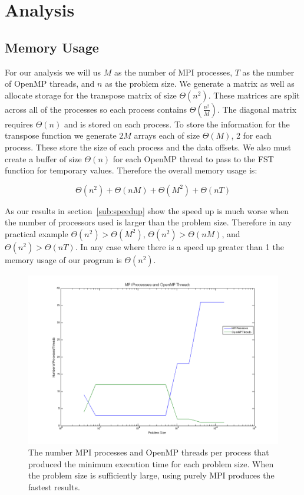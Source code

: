 \documentclass{article}
\begin{document}
	

\section{Analysis}

\subsection{Memory Usage}

	For our analysis we will us $M$ as the number of MPI processes, $T$ as the number of OpenMP threads, and $n$ as the problem size. We generate a matrix as well as allocate storage for the transpose matrix of size $\Theta(n^2)$. These matrices are split across all of the processes so each process contains $\Theta(\frac{n^2}{M})$. The diagonal matrix requires $\Theta(n)$ and is stored on each process. To store the information for the transpose function we generate $2M$ arrays each of size $\Theta(M)$, 2 for each process. These store the size of each process and the data offsets. We also must create a buffer of size $\Theta(n)$ for each OpenMP thread to pass to the FST function for temporary values. Therefore the overall memory usage is:

	\begin{equation}
		\Theta(n^2) + \Theta(nM) + \Theta(M^2) + \Theta(nT)
	\end{equation}

	As our results in section~\ref{sub:speedup} show the speed up is much worse when the number of processors used is larger than the problem size. Therefore in any practical example $\Theta(n^2) > \Theta(M^2)$, $\Theta(n^2) > \Theta(nM)$, and $\Theta(n^2) > \Theta(nT)$. In any case where there is a speed up greater than 1 the memory usage of our program is $\Theta(n^2)$.

	\begin{figure}[htbp]
	\begin{center}
	\includegraphics[width=15cm,keepaspectratio=true]{figs/threadsProcesses}
	\caption{The number MPI processes and OpenMP threads per process that produced the minimum execution time for each problem size. When the problem size is sufficiently large, using purely MPI produces the fastest results.}
	\label{fig:threadsProcesses}
	\end{center}
	\end{figure}
\end{document}
